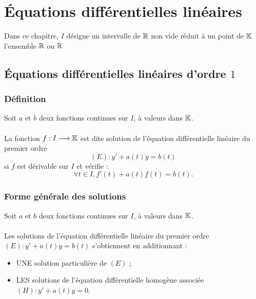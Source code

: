 \chapter{Équations différentielles  linéaires}

\minitoc

Dans ce chapitre, \(I\) désigne un intervalle de \(\mathbb{R}\) non vide réduit à un point de \(\mathbb{K}\) l'ensemble \(\mathbb{R}\) ou \(\mathbb{R}\)

\section{Équations différentielles linéaires d’ordre \(1\)}
\subsection{Définition}
\begin{defi}
    Soit \(a\) et \(b\) deux fonctions continues sur \(I\), à valeurs dans \(\mathbb{K}\).\\~\\
    La fonction \(f : I \longrightarrow \mathbb{K}\) est dite solution de l’équation différentielle linéaire du premier ordre
    \[(E) : y' + a(t)y = b(t)\]
    si \(f\) est dérivable sur \(I\) et vérifie :
    \[\forall t \in I, f'(t) + a(t)f (t) = b(t).\]
\end{defi}

\subsection{Forme générale des solutions}
\begin{defprop}
    Soit \(a\) et \(b\) deux fonctions continues sur \(I\), à valeurs dans \(\mathbb{K}\).\\~\\
    Les solutions de l’équation différentielle linéaire du premier ordre \((E) : y' + a(t)y = b(t)\) s’obtiennent en additionnant :
    \begin{itemize}
        \item UNE solution particulière de \((E)\) ;
        \item LES solutions de l’équation différentielle homogène associée \((H) : y' + a(t)y = 0\).
    \end{itemize}
    
\end{defprop}

